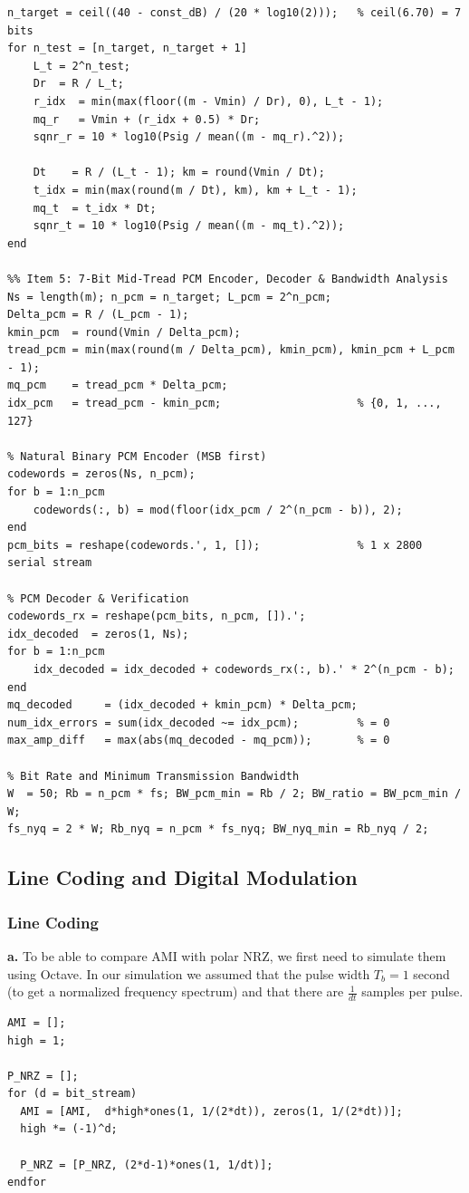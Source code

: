 \documentclass[a4paper]{article}
\begin{document}
\begin{lstlisting}[basicstyle=\ttfamily\scriptsize, breaklines=true, breakatwhitespace=true, frame=single, xleftmargin=6pt, xrightmargin=6pt, framexleftmargin=6pt, framexrightmargin=6pt, aboveskip=4pt, belowskip=6pt]
%% Item 4(d): Minimum Bits Required for SQNR >= 40 dB & Simulation Check
n_target = ceil((40 - const_dB) / (20 * log10(2)));   % ceil(6.70) = 7 bits
for n_test = [n_target, n_target + 1]
    L_t = 2^n_test;
    Dr  = R / L_t;
    r_idx  = min(max(floor((m - Vmin) / Dr), 0), L_t - 1);
    mq_r   = Vmin + (r_idx + 0.5) * Dr;
    sqnr_r = 10 * log10(Psig / mean((m - mq_r).^2));

    Dt    = R / (L_t - 1); km = round(Vmin / Dt);
    t_idx = min(max(round(m / Dt), km), km + L_t - 1);
    mq_t  = t_idx * Dt;
    sqnr_t = 10 * log10(Psig / mean((m - mq_t).^2));
end

%% Item 5: 7-Bit Mid-Tread PCM Encoder, Decoder & Bandwidth Analysis
Ns = length(m); n_pcm = n_target; L_pcm = 2^n_pcm;
Delta_pcm = R / (L_pcm - 1);
kmin_pcm  = round(Vmin / Delta_pcm);
tread_pcm = min(max(round(m / Delta_pcm), kmin_pcm), kmin_pcm + L_pcm - 1);
mq_pcm    = tread_pcm * Delta_pcm;
idx_pcm   = tread_pcm - kmin_pcm;                     % {0, 1, ..., 127}

% Natural Binary PCM Encoder (MSB first)
codewords = zeros(Ns, n_pcm);
for b = 1:n_pcm
    codewords(:, b) = mod(floor(idx_pcm / 2^(n_pcm - b)), 2);
end
pcm_bits = reshape(codewords.', 1, []);               % 1 x 2800 serial stream

% PCM Decoder & Verification
codewords_rx = reshape(pcm_bits, n_pcm, []).';
idx_decoded  = zeros(1, Ns);
for b = 1:n_pcm
    idx_decoded = idx_decoded + codewords_rx(:, b).' * 2^(n_pcm - b);
end
mq_decoded     = (idx_decoded + kmin_pcm) * Delta_pcm;
num_idx_errors = sum(idx_decoded ~= idx_pcm);         % = 0
max_amp_diff   = max(abs(mq_decoded - mq_pcm));       % = 0

% Bit Rate and Minimum Transmission Bandwidth
W  = 50; Rb = n_pcm * fs; BW_pcm_min = Rb / 2; BW_ratio = BW_pcm_min / W;
fs_nyq = 2 * W; Rb_nyq = n_pcm * fs_nyq; BW_nyq_min = Rb_nyq / 2;
\end{lstlisting}

\subsection{Line Coding and Digital Modulation}
\subsubsection{Line Coding}
\noindent\textbf{a.} To be able to compare AMI with polar NRZ, we first need to simulate them using Octave. In our simulation we assumed that the pulse width $T_b=1$ second (to get a normalized frequency spectrum) and that there are $\frac{1}{dt}$ samples per pulse.
\begin{lstlisting}
AMI = [];
high = 1;

P_NRZ = [];
for (d = bit_stream)
  AMI = [AMI,  d*high*ones(1, 1/(2*dt)), zeros(1, 1/(2*dt))];
  high *= (-1)^d;

  P_NRZ = [P_NRZ, (2*d-1)*ones(1, 1/dt)];
endfor
\end{lstlisting}
\end{document}
